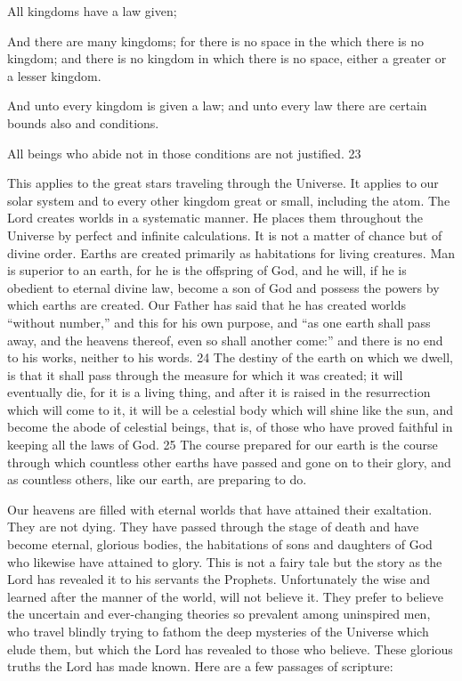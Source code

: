 All kingdoms have a law given;

And there are many kingdoms; for there is no space in the which there is no kingdom; and
there is no kingdom in which there is no space, either a greater or a lesser kingdom.

And unto every kingdom is given a law; and unto every law there are certain bounds also and
conditions.

All beings who abide not in those conditions are not justified. 23

This applies to the great stars traveling through the Universe. It applies to our solar system
and to every other kingdom great or small, including the atom. The Lord creates worlds in a
systematic manner. He places them throughout the Universe by perfect and infinite
calculations. It is not a matter of chance but of divine order. Earths are created primarily as
habitations for living creatures. Man is superior to an earth, for he is the offspring of God,
and he will, if he is obedient to eternal divine law, become a son of God and possess the
powers by which earths are created. Our Father has said that he has created worlds ``without
number,'' and this for his own purpose, and ``as one earth shall pass away, and the heavens
thereof, even so shall another come:'' and there is no end to his works, neither to his words.
24 The destiny of the earth on which we dwell, is that it shall pass through the measure for
which it was created; it will eventually die, for it is a living thing, and after it is raised in the
resurrection which will come to it, it will be a celestial body which will shine like the sun,
and become the abode of celestial beings, that is, of those who have proved faithful in
keeping all the laws of God. 25 The course prepared for our earth is the course through which
countless other earths have passed and gone on to their glory, and as countless others, like
our earth, are preparing to do.

Our heavens are filled with eternal worlds that have attained their exaltation. They are not
dying. They have passed through the stage of death and have become eternal, glorious
bodies, the habitations of sons and daughters of God who likewise have attained to glory.
This is not a fairy tale but the story as the Lord has revealed it to his servants the Prophets.
Unfortunately the wise and learned after the manner of the world, will not believe it. They
prefer to believe the uncertain and ever-changing theories so prevalent among uninspired
men, who travel blindly trying to fathom the deep mysteries of the Universe which elude
them, but which the Lord has revealed to those who believe. These glorious truths the Lord
has made known. Here are a few passages of scripture:

